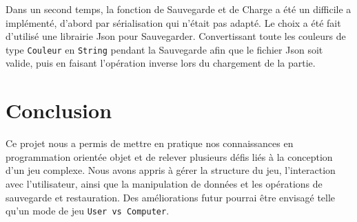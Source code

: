 \documentclass{article}
\begin{document}
Dans un second temps, la fonction de Sauvegarde et de Charge a été un difficile a implémenté, d'abord par sérialisation qui n'était pas adapté. Le choix a été fait d'utilisé une librairie  Json pour Sauvegarder. Convertissant toute les couleurs de type \texttt{Couleur} en \texttt{String} pendant la Sauvegarde afin que le fichier Json soit valide, puis en faisant l'opération inverse lors du chargement de la partie. 

\section{Conclusion}
Ce projet nous a permis de mettre en pratique nos connaissances en programmation orientée objet et de relever plusieurs défis liés à la conception d'un jeu complexe. Nous avons appris à gérer la structure du jeu, l'interaction avec l'utilisateur, ainsi que la manipulation de données et les opérations de sauvegarde et restauration. Des améliorations futur pourrai être envisagé telle qu'un mode de jeu \texttt{User vs Computer}. 
\end{document}

